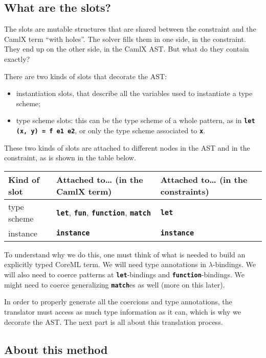 \documentclass[10pt,a4paper,twoside,titlepage,twocolumn]{article}
\newcommand{\code}[1]{\textbf{\texttt{#1}}}
\begin{document}
\subsection{What are the slots?}

The slots are mutable structures that are shared between the constraint and the
CamlX term ``with holes''. The solver fills them in one side, in the constraint.
They end up on the other side, in the CamlX AST. But what do they contain
exactly?

There are two kinds of slots that decorate the AST:
\begin{itemize}
  \item instantiation slots, that describe all the variables used to
    instantiate a type scheme;
  \item type scheme slots: this can be the type scheme of a whole pattern,
    as in \code{let (x, y) = f e1 e2}, or only the type scheme associated to
    \code{x}.
\end{itemize}

These two kinds of slots are attached to different nodes in the AST and in the
constraint, as is shown in the table below.

\begin{center}
  \small
  \begin{tabular}{l|p{2.5cm}|p{2.5cm}}
    \textbf{Kind of slot} & Attached to… (\textbf{in the CamlX term}) & Attached
    to… (\textbf{in the constraints}) \\
    \hline
    type scheme & \code{let}, \code{fun}, \code{function}, \code{match} & \code{let} \\
    \hline
    instance    & \code{instance} & \code{instance}
  \end{tabular}
\end{center}

To understand why we do this, one must think of what is needed to build an
explicitly typed CoreML term. We will need type annotations in
$\lambda$-bindings. We will also need to coerce patterns at \code{let}-bindings
and \code{function}-bindings.  We might need to coerce generalizing
\code{match}es as well (more on this later).

In order to properly generate all the coercions and type annotations, the
translator must access as much type information as it can, which is why we
decorate the AST. The next part is all about this translation process.

\subsection{About this method}
\end{document}
